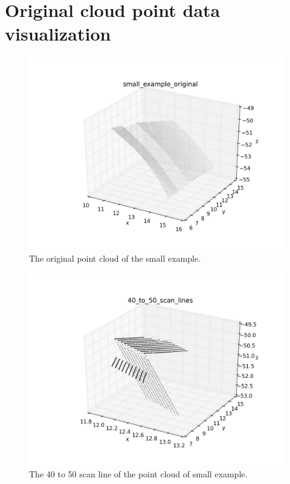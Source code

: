 \documentclass[a4paper,12pt]{article}
\begin{document}
\section{Original cloud point data visualization}
\begin{figure}[H]
  \begin{center}
      \includegraphics[scale=0.65]{small_example_original.png}
\end{center}
\caption{The original point cloud of the small example.}
 \label{fig:sml_origin}
 \end{figure}
 
  \begin{figure}[H]
  \begin{center}
      \includegraphics[scale=0.65]{40_to_50_scan_lines.png}
\end{center}
\caption{The 40 to 50 scan line of the point cloud of small example.}
 \label{fig:40_50_sml_origin}
 \end{figure}
\end{document}
